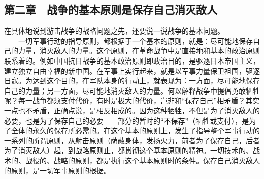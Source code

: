 \documentclass[cn,11pt,chinese]{elegantbook}
\def\myformat#1{\hfil\hfil #1}
\begin{document}
\subsection*{\myformat{第二章　战争的基本原则是保存自己消灭敌人}}
在具体地说到游击战争的战略问题之先，还要说一说战争的基本问题。\\
　　一切军事行动的指导原则，都根据于一个基本的原则，就是：尽可能地保存自己的力量，消灭敌人的力量。这个原则，在革命战争中是直接地和基本的政治原则联系着的。例如中国抗日战争的基本政治原则即政治目的，是驱逐日本帝国主义，建立独立自由幸福的新中国。在军事上实行起来，就是以军事力量保卫祖国，驱逐日寇。为达到这个目的，在军队本身的行动上，就表现为：一方面，尽可能地保存自己的力量；另一方面，尽可能地消灭敌人的力量。何以解释战争中提倡勇敢牺牲呢？每一战争都须支付代价，有时是极大的代价，岂非和“保存自己”相矛盾？其实一点也不矛盾，正确点说，是相反相成的。因为这种牺牲，不但是为了消灭敌人的必要，也是为了保存自己的必要——部分的暂时的“不保存”（牺牲或支付），是为了全体的永久的保存所必需的。在这个基本的原则上，发生了指导整个军事行动的一系列的所谓原则，从射击原则（荫蔽身体，发扬火力，前者为了保存自己，后者为了消灭敌人）起，到战略原则止，都贯彻这个基本原则的精神。一切技术的、战术的、战役的、战略的原则，都是执行这个基本原则时的条件。保存自己消灭敌人的原则，是一切军事原则的根据。\\
\end{document}
